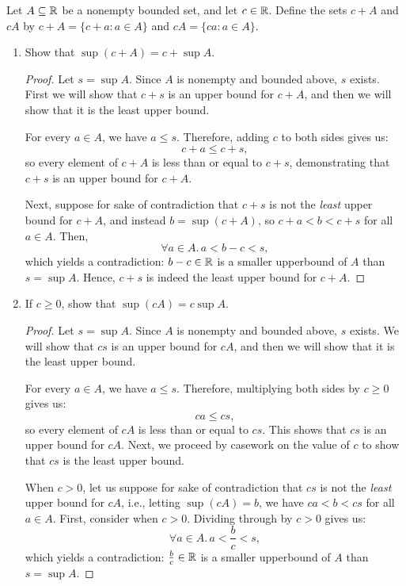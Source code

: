 \begin{problem}\label{prob:sup-inf-linear-transformation}
  Let $A \subseteq \mathbb{R}$ be a nonempty bounded set, and let $c \in \mathbb{R}$. Define the sets $c + A$ and $cA$ by 
  $c + A = \{c + a : a \in A\}$ and $cA = \{ca : a \in A\}$.
  \begin{enumerate}[label=(\alph*)]
    \item Show that $\sup(c + A) = c + \sup A$. \label{prob:sup-c+A}

      \begin{proof}
        Let $s = \sup A$. Since $A$ is nonempty and bounded above, $s$ exists. First we will show that $c + s$ is an upper bound for $c + A$, 
        and then we will show that it is the least upper bound.

        For every $a \in A$, we have $a \leq s$. Therefore, adding $c$ to both sides gives us:
        \[
          c + a \leq c + s,
        \]
        so every element of $c + A$ is less than or equal to $c + s$, demonstrating that $c + s$ is an upper bound for $c + A$.

        Next, suppose for sake of contradiction that $c + s$ is not the \textit{least} upper bound for $c + A$, and instead
        $b = \sup(c + A)$, so $c + a < b < c + s$ for all $a \in A$. Then,
        \[
          \forall a \in A.\, a < b - c < s,
        \]
        which yields a contradiction: $b-c \in \mathbb{R}$ is a smaller upperbound of $A$ than $s = \sup A$.
        Hence, $c + s$ is indeed the least upper bound for $c + A$.
      \end{proof}

    \item If $c \geq 0$, show that $\sup(cA) = c \sup A$. \label{prob:sup-cA}

      \begin{proof}
        Let $s = \sup A$. Since $A$ is nonempty and bounded above, $s$ exists. We will show that $c s$ is an upper bound for $cA$, and then 
        we will show that it is the least upper bound.

        For every $a \in A$, we have $a \leq s$. Therefore, multiplying both sides by $c \geq 0$ gives us:
        \[
          ca \leq cs,
        \]
        so every element of $cA$ is less than or equal to $cs$. This shows that $cs$ is an upper bound for $cA$. 
        Next, we proceed by casework on the value of $c$ to show that $cs$ is the least upper bound.

        When $c > 0$, let us suppose for sake of contradiction that $cs$ is not the \textit{least} upper bound 
        for $cA$, i.e., letting $\sup(cA) = b$, we have $ca < b < cs$ for all $a \in A$. First, consider when $c > 0$. Dividing through 
        by $c > 0$ gives us:
        \[
          \forall a \in A.\, a < \frac{b}{c} < s,
        \]
        which yields a contradiction: $\frac{b}{c} \in \mathbb{R}$ is a smaller upperbound of $A$ than $s = \sup A$.


\end{proof}
\end{enumerate}
\end{problem}
